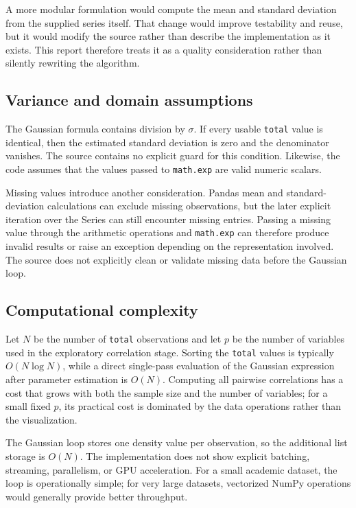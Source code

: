\documentclass[11pt,a4paper]{article}
\begin{document}
A more modular formulation would compute the mean and standard deviation from the supplied series itself. That change would improve testability and reuse, but it would modify the source rather than describe the implementation as it exists. This report therefore treats it as a quality consideration rather than silently rewriting the algorithm.

\subsection{Variance and domain assumptions}
The Gaussian formula contains division by $\sigma$. If every usable \texttt{total} value is identical, then the estimated standard deviation is zero and the denominator vanishes. The source contains no explicit guard for this condition. Likewise, the code assumes that the values passed to \texttt{math.exp} are valid numeric scalars.

Missing values introduce another consideration. Pandas mean and standard-deviation calculations can exclude missing observations, but the later explicit iteration over the Series can still encounter missing entries. Passing a missing value through the arithmetic operations and \texttt{math.exp} can therefore produce invalid results or raise an exception depending on the representation involved. The source does not explicitly clean or validate missing data before the Gaussian loop.

\subsection{Computational complexity}
Let $N$ be the number of \texttt{total} observations and let $p$ be the number of variables used in the exploratory correlation stage. Sorting the \texttt{total} values is typically $O(N\log N)$, while a direct single-pass evaluation of the Gaussian expression after parameter estimation is $O(N)$. Computing all pairwise correlations has a cost that grows with both the sample size and the number of variables; for a small fixed $p$, its practical cost is dominated by the data operations rather than the visualization.

The Gaussian loop stores one density value per observation, so the additional list storage is $O(N)$. The implementation does not show explicit batching, streaming, parallelism, or GPU acceleration. For a small academic dataset, the loop is operationally simple; for very large datasets, vectorized NumPy operations would generally provide better throughput.
\end{document}
